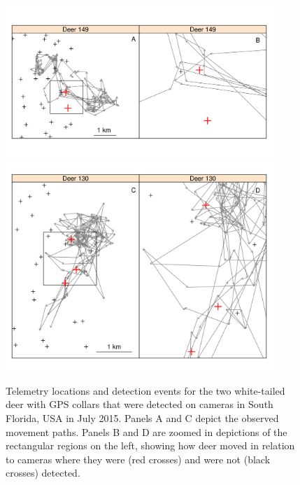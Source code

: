 \documentclass[12pt]{article}
\begin{document}
\begin{figure}[h!]
  \centering
  \includegraphics[width=0.9\textwidth]{figs/UD-path-149-zoom} \\
  \vspace{-1.1cm}
  \includegraphics[width=0.9\textwidth]{figs/UD-path-130-zoom} \\
  \caption{Telemetry locations and detection events for the two
    white-tailed deer with GPS collars that were detected on cameras
    in South Florida, USA in July 2015. Panels A and C depict
    the observed movement paths. Panels B and D are zoomed in
    depictions of the rectangular regions on the left, showing how
    deer moved in relation to cameras where they were (red crosses)
    and were not (black crosses) detected. } 
  \label{fig:path-cam}
\end{figure}


\clearpage
\end{document}
